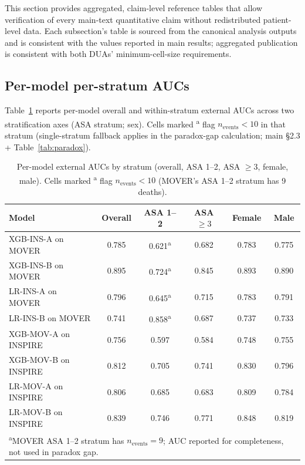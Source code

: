 \documentclass[11pt,a4paper]{article}
\begin{document}
This section provides aggregated, claim-level reference tables that allow
verification of every main-text quantitative claim without redistributed
patient-level data. Each subsection's table is sourced from the canonical
analysis outputs and is consistent with the values reported in main
results; aggregated publication is consistent with both DUAs'
minimum-cell-size requirements.

\subsection{Per-model per-stratum AUCs}\label{supp:s6-stratum-auc}

Table~\ref{tab:s6-stratum-auc} reports per-model overall and within-stratum
external AUCs across two stratification axes (ASA stratum; sex). Cells marked \textsuperscript{a}
flag $n_{\text{events}} < 10$ in that stratum (single-stratum
fallback applies in the paradox-gap calculation; main \S2.3 + Table~\ref{tab:paradox}).

\begin{table}[H]
\centering
\caption{Per-model external AUCs by stratum (overall, ASA 1--2, ASA $\geq 3$,
female, male). Cells marked \textsuperscript{a} flag $n_{\text{events}} < 10$ (MOVER's
ASA 1--2 stratum has 9 deaths).}
\label{tab:s6-stratum-auc}
\setlength{\tabcolsep}{4pt}
\small
\begin{tabular}{lccccc}
\toprule
\textbf{Model} & \textbf{Overall} & \textbf{ASA 1--2} & \textbf{ASA $\geq 3$} & \textbf{Female} & \textbf{Male} \\
\midrule
XGB-INS-A on MOVER  & 0.785 & 0.621\textsuperscript{a} & 0.682 & 0.783 & 0.775 \\
XGB-INS-B on MOVER  & 0.895 & 0.724\textsuperscript{a} & 0.845 & 0.893 & 0.890 \\
LR-INS-A on MOVER   & 0.796 & 0.645\textsuperscript{a} & 0.715 & 0.783 & 0.791 \\
LR-INS-B on MOVER   & 0.741 & 0.858\textsuperscript{a} & 0.687 & 0.737 & 0.733 \\
\midrule
XGB-MOV-A on INSPIRE & 0.756 & 0.597 & 0.584 & 0.748 & 0.755 \\
XGB-MOV-B on INSPIRE & 0.812 & 0.705 & 0.741 & 0.830 & 0.796 \\
LR-MOV-A on INSPIRE  & 0.806 & 0.685 & 0.683 & 0.809 & 0.784 \\
LR-MOV-B on INSPIRE  & 0.839 & 0.746 & 0.771 & 0.848 & 0.819 \\
\bottomrule
\multicolumn{6}{l}{\footnotesize \textsuperscript{a}MOVER ASA 1--2 stratum has $n_{\text{events}} = 9$; AUC reported for completeness, not used in paradox gap.} \\
\end{tabular}
\end{table}
\end{document}
